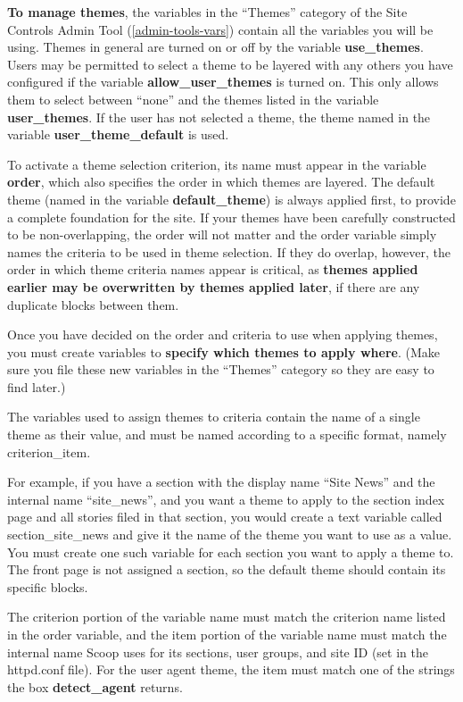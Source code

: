 {\bf To manage themes}, the variables in the ``Themes'' category of the Site Controls Admin Tool (\ref{admin-tools-vars}) contain all the variables you will be using.  Themes in general are turned on or off by the variable {\bf use\_themes}.  Users may be permitted to select a theme to be layered with any others you have configured if the variable {\bf allow\_user\_themes} is turned on.  This only allows them to select between ``none'' and the themes listed in the variable {\bf user\_themes}.  If the user has not selected a theme, the theme named in the variable {\bf user\_theme\_default} is used.

To activate a theme selection criterion, its name must appear in the variable {\bf order}, which also specifies the order in which themes are layered.  The default theme (named in the variable {\bf default\_theme}) is always applied first, to provide a complete foundation for the site.  If your themes have been carefully constructed to be non-overlapping, the order will not matter and the order variable simply names the criteria to be used in theme selection.  If they do overlap, however, the order in which theme criteria names appear is critical, as {\bf themes applied earlier may be overwritten by themes applied later}, if there are any duplicate blocks between them.

Once you have decided on the order and criteria to use when applying themes, you must create variables to {\bf specify which themes to apply where}.  (Make sure you file these new variables in the ``Themes'' category so they are easy to find later.)

The variables used to assign themes to criteria contain the name of a single theme as their value, and must be named according to a specific format, namely \latexhtml{$<$}{<}criterion\latexhtml{$>$}{>}\_\latexhtml{$<$}{<}item\latexhtml{$>$}{>}.  

For example, if you have a section with the display name ``Site News'' and the internal name ``site\_news'', and you want a theme to apply to the section index page and all stories filed in that section, you would create a text variable called section\_site\_news and give it the name of the theme you want to use as a value.  You must create one such variable for each section you want to apply a theme to.  The front page is not assigned a section, so the default theme should contain its specific blocks.

The criterion portion of the variable name must match the criterion name listed in the order variable, and the item portion of the variable name must match the internal name Scoop uses for its sections, user groups, and site ID (set in the httpd.conf file).  For the user agent theme, the item must match one of the strings the box {\bf detect\_agent} returns.  

